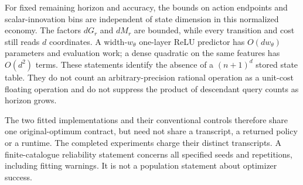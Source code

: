 For fixed remaining horizon and accuracy, the bounds on action endpoints and scalar-innovation bins are independent of state dimension in this normalized economy. The factors $dG_r$ and $dM_r$ are bounded, while every transition and cost still reads $d$ coordinates. A width-$w_\theta$ one-layer ReLU predictor has $O(dw_\theta)$ parameters and evaluation work; a dense quadratic on the same features has $O(d^2)$ terms. These statements identify the absence of a $(n+1)^d$ stored state table. They do not count an arbitrary-precision rational operation as a unit-cost floating operation and do not suppress the product of descendant query counts as horizon grows.

The two fitted implementations and their conventional controls therefore share one original-optimum contract, but need not share a transcript, a returned policy or a runtime. The completed experiments charge their distinct transcripts. A finite-catalogue reliability statement concerns all specified seeds and repetitions, including fitting warnings. It is not a population statement about optimizer success.
